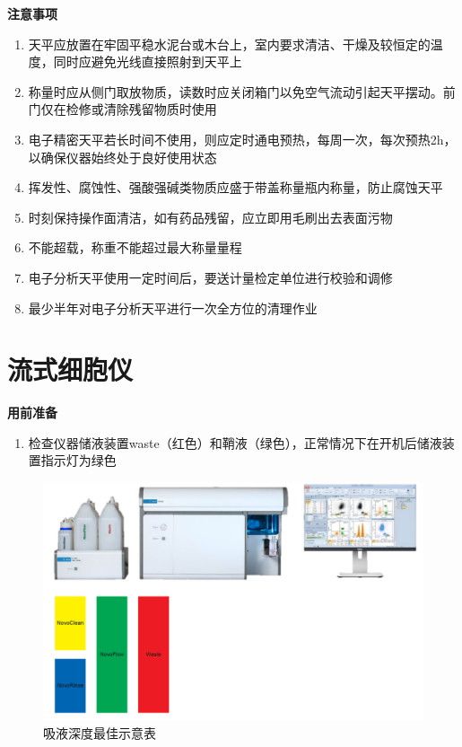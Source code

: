 \documentclass[
]{book}
\providecommand{\tightlist}{%
  \setlength{\itemsep}{0pt}\setlength{\parskip}{0pt}}
\begin{document}
\textbf{注意事项}

\begin{enumerate}
\def\labelenumi{\arabic{enumi}.}
\tightlist
\item
  天平应放置在牢固平稳水泥台或木台上，室内要求清洁、干燥及较恒定的温度，同时应避免光线直接照射到天平上
\item
  称量时应从侧门取放物质，读数时应关闭箱门以免空气流动引起天平摆动。前门仅在检修或清除残留物质时使用
\item
  电子精密天平若长时间不使用，则应定时通电预热，每周一次，每次预热2h，以确保仪器始终处于良好使用状态
\item
  挥发性、腐蚀性、强酸强碱类物质应盛于带盖称量瓶内称量，防止腐蚀天平
\item
  时刻保持操作面清洁，如有药品残留，应立即用毛刷出去表面污物
\item
  不能超载，称重不能超过最大称量量程
\item
  电子分析天平使用一定时间后，要送计量检定单位进行校验和调修
\item
  最少半年对电子分析天平进行一次全方位的清理作业
\end{enumerate}

\hypertarget{ux6d41ux5f0fux7ec6ux80deux4eea}{%
\section{流式细胞仪}\label{ux6d41ux5f0fux7ec6ux80deux4eea}}

\textbf{用前准备}

\begin{enumerate}
\def\labelenumi{\arabic{enumi}.}
\tightlist
\item
  检查仪器储液装置waste（红色）和鞘液（绿色），正常情况下在开机后储液装置指示灯为绿色
\end{enumerate}

\begin{figure}

{\centering \includegraphics[width=0.5\linewidth]{images/流式细胞仪} 

}

\caption{吸液深度最佳示意表}\label{fig:unnamed-chunk-5}
\end{figure}
\end{document}

